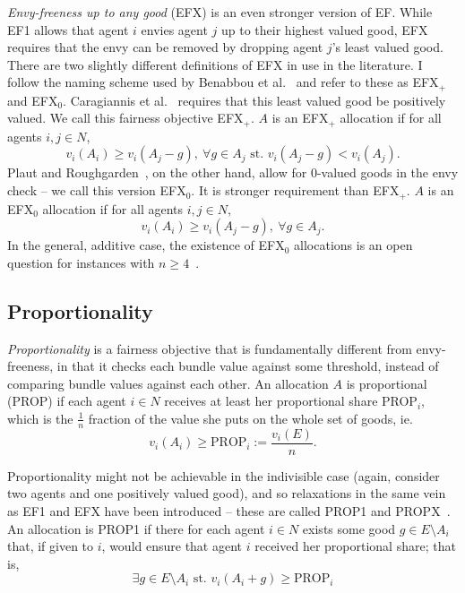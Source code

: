 \textit{Envy-freeness up to any good} (EFX) is an even stronger version of EF. While EF1 allows that agent $i$ envies agent $j$ up to their highest valued good, EFX requires that the envy can be removed by dropping agent $j$'s least valued good. There are two slightly different definitions of EFX in use in the literature. I follow the naming scheme used by Benabbou et al.~\cite{benabbou-2021} and refer to these as EFX$_+$ and EFX$_0$. Caragiannis et al.~\cite{caragiannis-Unreasonable} requires that this least valued good be positively valued. We call this fairness objective EFX$_+$. $A$ is an EFX$_+$ allocation if for all agents $i,j \in N$,
\begin{equation} \tag{EFX$_+$}
  v_i(A_i) \geq v_i(A_j - g),\ \forall g \in A_j \text{ st. } v_i(A_j-g) < v_i(A_j).
\end{equation}
Plaut and Roughgarden~\cite{plaut2017envyfreeness}, on the other hand, allow for 0-valued goods in the envy check -- we call this version EFX$_0$. It is stronger requirement than EFX$_+$. $A$ is an EFX$_0$ allocation if for all agents $i,j \in N$,
\begin{equation} \tag{EFX$_0$}
  v_i(A_i) \geq v_i(A_j - g),\ \forall g \in A_j.
\end{equation}
In the general, additive case, the existence of EFX$_0$ allocations is an open question for instances with $n\geq4$~\cite{amanatidis2022fair}.

\subsection{Proportionality}
\textit{Proportionality} is a fairness objective that is fundamentally different from envy-freeness, in that it checks each bundle value against some threshold, instead of comparing bundle values against each other. An allocation $A$ is proportional (PROP) if each agent $i\in N$ receives at least her proportional share PROP$_i$, which is the $\frac{1}{n}$ fraction of the value she puts on the whole set of goods, ie.
\begin{equation}\tag{PROP}
  v_i(A_i)\geq \text{PROP}_i := \frac{v_i(E)}{n}.
\end{equation}

Proportionality might not be achievable in the indivisible case (again, consider two agents and one positively valued good), and so relaxations in the same vein as EF1 and EFX have been introduced -- these are called PROP1 and PROPX~\cite{amanatidis2022fair}. An allocation is PROP1 if there for each agent $i \in N$ exists some good $g\in E\setminus A_i$ that, if given to $i$, would ensure that agent $i$ received her proportional share; that is, 
\begin{equation}\tag{PROP1}
  \exists g\in E\setminus A_i\text{ st. }v_i(A_i+g)\geq\text{PROP}_i
\end{equation}

